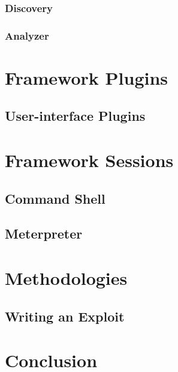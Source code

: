 \documentclass{report}
\begin{document}
        \subsection{Discovery}
        \subsection{Analyzer}
\chapter{Framework Plugins}
\label{framework-plugins}

    \section{User-interface Plugins}
\chapter{Framework Sessions}
\label{framework-sessions}
    \section{Command Shell}
    \section{Meterpreter}
\chapter{Methodologies}
    \section{Writing an Exploit}
\chapter{Conclusion}
\end{document}
